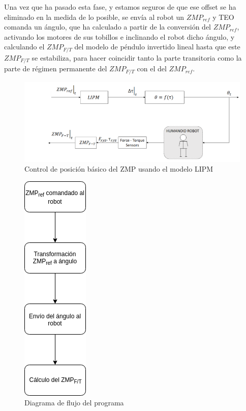 \begin{enumerate}
Una vez que ha pasado esta fase, y estamos seguros de que ese offset se ha eliminado en la medida de lo posible, se envía al robot un $ZMP_{ref}$ y TEO comanda un ángulo, que ha calculado a partir de la conversión del $ZMP_{ref}$, activando los motores de sus tobillos e inclinando el robot dicho ángulo, y calculando el $ZMP_{F/T}$ del modelo de péndulo invertido lineal hasta que este $ZMP_{F/T}$ se estabiliza, para hacer coincidir tanto la parte transitoria como la parte de régimen permanente del $ZMP_{F/T}$ con el del $ZMP_{ref}$.

\end{enumerate}

\begin{figure}[H]
\centering
\includegraphics[scale=2.2]{imagenes/apartado_5/5.1/51_esquema1}
\caption{Control de posición básico del ZMP usando el modelo LIPM}
\label{figura51}
\end{figure}

\begin{figure}[H]
\centering
\includegraphics[scale=0.7]{imagenes/apartado_5/5.1/52_diagrama_flujo1}
\caption{Diagrama de flujo del programa}
\label{figura52}
\end{figure}


